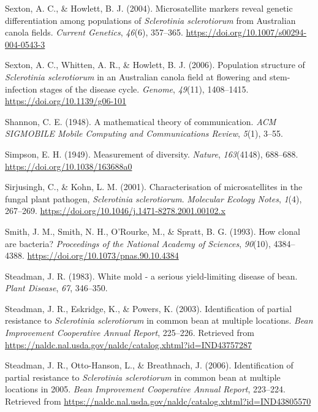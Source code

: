 \documentclass[fleqn,10pt,lineno]{wlpeerj} %
\theoremstyle{definition}
\theoremstyle{definition}
\theoremstyle{definition}
\theoremstyle{remark}
\begin{document}
\hypertarget{ref-sexton2004microsatellite}{}
Sexton, A. C., \& Howlett, B. J. (2004). Microsatellite markers reveal
genetic differentiation among populations of \emph{Sclerotinia
sclerotiorum} from Australian canola fields. \emph{Current Genetics},
\emph{46}(6), 357--365. \url{https://doi.org/10.1007/s00294-004-0543-3}

\hypertarget{ref-sexton2006population}{}
Sexton, A. C., Whitten, A. R., \& Howlett, B. J. (2006). Population
structure of \emph{Sclerotinia sclerotiorum} in an Australian canola
field at flowering and stem-infection stages of the disease cycle.
\emph{Genome}, \emph{49}(11), 1408--1415.
\url{https://doi.org/10.1139/g06-101}

\hypertarget{ref-shannon2001mathematical}{}
Shannon, C. E. (1948). A mathematical theory of communication. \emph{ACM
SIGMOBILE Mobile Computing and Communications Review}, \emph{5}(1),
3--55.

\hypertarget{ref-simpson1949measurement}{}
Simpson, E. H. (1949). Measurement of diversity. \emph{Nature},
\emph{163}(4148), 688--688. \url{https://doi.org/10.1038/163688a0}

\hypertarget{ref-sirjusingh2001characterisation}{}
Sirjusingh, C., \& Kohn, L. M. (2001). Characterisation of
microsatellites in the fungal plant pathogen, \emph{Sclerotinia
sclerotiorum}. \emph{Molecular Ecology Notes}, \emph{1}(4), 267--269.
\url{https://doi.org/10.1046/j.1471-8278.2001.00102.x}

\hypertarget{ref-smith1993how}{}
Smith, J. M., Smith, N. H., O'Rourke, M., \& Spratt, B. G. (1993). How
clonal are bacteria? \emph{Proceedings of the National Academy of
Sciences}, \emph{90}(10), 4384--4388.
\url{https://doi.org/10.1073/pnas.90.10.4384}

\hypertarget{ref-steadman1983white}{}
Steadman, J. R. (1983). White mold - a serious yield-limiting disease of
bean. \emph{Plant Disease}, \emph{67}, 346--350.

\hypertarget{ref-steadman2003identification}{}
Steadman, J. R., Eskridge, K., \& Powers, K. (2003). Identification of
partial resistance to \emph{Sclerotinia sclerotiorum} in common bean at
multiple locations. \emph{Bean Improvement Cooperative Annual Report},
225--226. Retrieved from
\url{https://naldc.nal.usda.gov/naldc/catalog.xhtml?id=IND43757287}

\hypertarget{ref-steadman2006identification}{}
Steadman, J. R., Otto-Hanson, L., \& Breathnach, J. (2006).
Identification of partial resistance to \emph{Sclerotinia sclerotiorum}
in common bean at multiple locations in 2005. \emph{Bean Improvement
Cooperative Annual Report}, 223--224. Retrieved from
\url{https://naldc.nal.usda.gov/naldc/catalog.xhtml?id=IND43805570}
\end{document}
